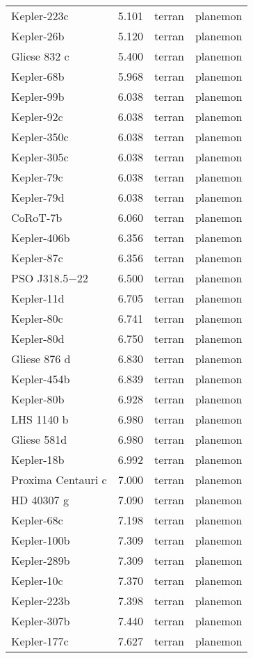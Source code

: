 \documentclass[
  letterpaper,
]{book}
\begin{document}
\begin{longtable}[]{@{}llll@{}}
Kepler-223c & 5.101 & terran & planemon \\
Kepler-26b & 5.120 & terran & planemon \\
Gliese 832 c & 5.400 & terran & planemon \\
Kepler-68b & 5.968 & terran & planemon \\
Kepler-99b & 6.038 & terran & planemon \\
Kepler-92c & 6.038 & terran & planemon \\
Kepler-350c & 6.038 & terran & planemon \\
Kepler-305c & 6.038 & terran & planemon \\
Kepler-79c & 6.038 & terran & planemon \\
Kepler-79d & 6.038 & terran & planemon \\
CoRoT-7b & 6.060 & terran & planemon \\
Kepler-406b & 6.356 & terran & planemon \\
Kepler-87c & 6.356 & terran & planemon \\
PSO J318.5−22 & 6.500 & terran & planemon \\
Kepler-11d & 6.705 & terran & planemon \\
Kepler-80c & 6.741 & terran & planemon \\
Kepler-80d & 6.750 & terran & planemon \\
Gliese 876 d & 6.830 & terran & planemon \\
Kepler-454b & 6.839 & terran & planemon \\
Kepler-80b & 6.928 & terran & planemon \\
LHS 1140 b & 6.980 & terran & planemon \\
Gliese 581d & 6.980 & terran & planemon \\
Kepler-18b & 6.992 & terran & planemon \\
Proxima Centauri c & 7.000 & terran & planemon \\
HD 40307 g & 7.090 & terran & planemon \\
Kepler-68c & 7.198 & terran & planemon \\
Kepler-100b & 7.309 & terran & planemon \\
Kepler-289b & 7.309 & terran & planemon \\
Kepler-10c & 7.370 & terran & planemon \\
Kepler-223b & 7.398 & terran & planemon \\
Kepler-307b & 7.440 & terran & planemon \\
Kepler-177c & 7.627 & terran & planemon \\

\end{longtable}
\end{document}

